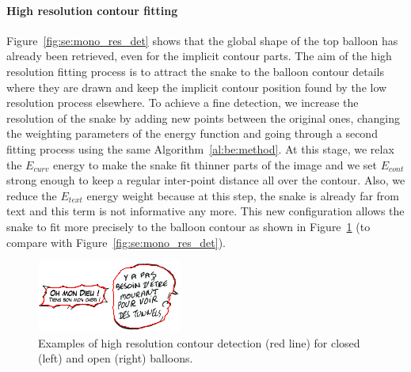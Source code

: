 \paragraph{High resolution contour fitting}
Figure~\ref{fig:se:mono_res_det} shows that the global shape of the top balloon has already been retrieved, even for the implicit contour parts.
The aim of the high resolution fitting process is to attract the snake to the balloon contour details where they are drawn and keep the implicit contour position found by the low resolution process elsewhere.
To achieve a fine detection, we increase the resolution of the snake by adding new points between the original ones, changing the weighting parameters of the energy function and going through a second fitting process using the same Algorithm~\ref{al:be:method}.
At this stage, we relax the $E_{curv}$ energy to make the snake fit thinner parts of the image and we set $E_{cont}$ strong enough to keep a regular inter-point distance all over the contour.
Also, we reduce the $E_{text}$ energy weight because at this step, the snake is already far from text and this term is not informative any more.
This new configuration allows the snake to fit more precisely to the balloon contour as shown in Figure~\ref{fig:se:hd_contour} (to compare with Figure~\ref{fig:se:mono_res_det}).


	\begin{figure}[!ht]	%
	  \centering
		\includegraphics[trim = 0mm 2mm 0mm 1mm, clip, width=180px]{multi_res_det.png}
		\caption[Examples of high resolution contour detection for balloon extraction]{Examples of high resolution contour detection (red line) for closed (left) and open (right) balloons.}
		\label{fig:se:hd_contour}
	\end{figure}

